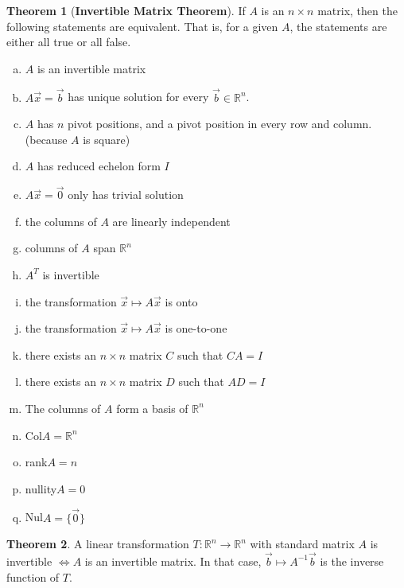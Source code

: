 \documentclass[a4paper,12pt]{article}
\theoremstyle{definition}
\newtheorem{theorem}{Theorem}
\theoremstyle{definition}
\newcommand{\mateq}[3]{#1#2 = #3}
\newcommand{\mateqaxb}{\mateq{A}{\vec{x}}{\vec{b}}}
\newcommand{\mateqaxo}{\mateq{A}{\vec{x}}{\vec{0}}}
\begin{document}
	\begin{theorem}[\textbf{Invertible Matrix Theorem}]
		\label{thm:imt-thm}
		If $A$ is an $n \times n$ matrix, then the following statements are equivalent. That
		is, for a given $A$, the statements are either all true or all false.
		
		\begin{enumerate}[a.]
			\item $A$ is an invertible matrix
			\item $\mateqaxb$ has unique solution for every $\vec{b} \in \mathbb{R}^n$.
			\item $A$ has $n$ pivot positions, and a pivot position in every row and column. (because $A$ is square)
			\item $A$ has reduced echelon form $I$
			\item $\mateqaxo$ only has trivial solution
			\item the columns of $A$ are linearly independent
			\item columns of $A$ span $\mathbb{R}^n$
			\item $A^T$ is invertible
			\item the transformation $\vec{x} \mapsto A\vec{x}$ is onto
			\item the transformation $\vec{x} \mapsto A\vec{x}$ is one-to-one
			\item there exists an $n \times n$ matrix $C$ such that $\mateq{C}{A}{I}$
			\item there exists an $n \times n$ matrix $D$ such that $\mateq{A}{D}{I}$
			\item The columns of $A$ form a basis of $\mathbb{R}^n$
			\item Col$A = \mathbb{R}^n$
			\item rank$A = n$
			\item nullity$A = 0$
			\item Nul$A = \{\vec{0}\}$
		\end{enumerate}
	\end{theorem}
	
	\begin{theorem}
		\label{thm:invertible-trans-thm}
		A linear transformation $T: \mathbb{R}^n \rightarrow \mathbb{R}^n$ with standard matrix $A$ is invertible $\Leftrightarrow A$ is an invertible matrix. In that case, $\vec{b} \mapsto A^{-1}\vec{b}$ is the inverse function of $T$.
	\end{theorem}
	
\end{document}

